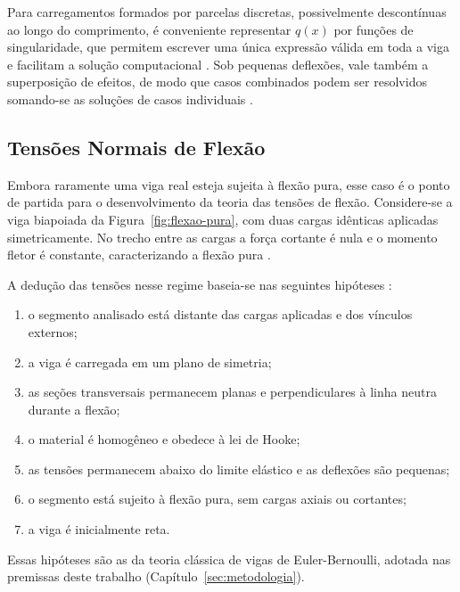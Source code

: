\documentclass[arial,centeredequations,english,brazilian,oneside,section=TITLE]{ifes8}
\begin{document}
Para carregamentos formados por parcelas discretas, possivelmente descontínuas ao longo
do comprimento, é conveniente representar $q(x)$ por funções de singularidade, que
permitem escrever uma única expressão válida em toda a viga e facilitam a solução
computacional \cite{Norton2013}. Sob pequenas deflexões, vale também a
superposição de efeitos, de modo que casos combinados podem ser resolvidos somando-se
as soluções de casos individuais \cite{Norton2013}.

\subsection{Tensões Normais de Flexão}
\label{sub:tensoes-flexao}

Embora raramente uma viga real esteja sujeita à flexão pura, esse caso é o ponto de
partida para o desenvolvimento da teoria das tensões de flexão. Considere-se a viga
biapoiada da Figura~\ref{fig:flexao-pura}, com duas cargas idênticas aplicadas
simetricamente. No trecho entre as cargas a força cortante é nula e o momento
fletor é constante, caracterizando a flexão pura \cite{Norton2013}.

A dedução das tensões nesse regime baseia-se nas seguintes hipóteses
\cite{Norton2013}:

\begin{enumerate}
  \item o segmento analisado está distante das cargas aplicadas e dos vínculos externos;
  \item a viga é carregada em um plano de simetria;
  \item as seções transversais permanecem planas e perpendiculares à linha neutra
  durante a flexão;
  \item o material é homogêneo e obedece à lei de Hooke;
  \item as tensões permanecem abaixo do limite elástico e as deflexões são pequenas;
  \item o segmento está sujeito à flexão pura, sem cargas axiais ou cortantes;
  \item a viga é inicialmente reta.
\end{enumerate}

Essas hipóteses são as da teoria clássica de vigas de Euler-Bernoulli, adotada nas
premissas deste trabalho (Capítulo~\ref{sec:metodologia}).
\end{document}
